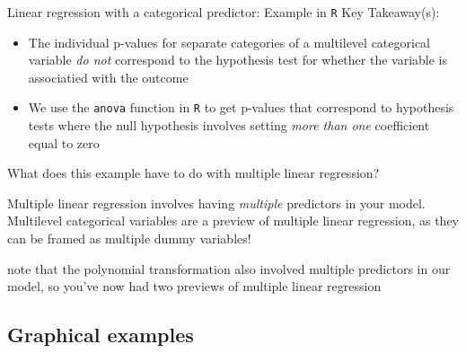 \documentclass[10pt,t]{beamer}
\begin{document}
\begin{frame}{Linear regression with a categorical predictor: Example in \texttt{R}}
Key Takeaway(s):
\vspace{0.3cm}

\begin{itemize}
	\item The individual p-values for separate categories of a multilevel categorical variable \textit{do not} correspond to the hypothesis test for whether the variable is associatied with the outcome
	\item We use the \texttt{anova} function in \texttt{R} to get p-values that correspond to hypothesis tests where the null hypothesis involves setting \textit{more than one} coefficient equal to zero
\end{itemize} \pause

\vspace{0.3cm}

What does this example have to do with multiple linear regression? 

\vspace{0.3cm}

Multiple linear regression involves having \textit{multiple} predictors in your model. Multilevel categorical variables are a preview of multiple linear regression, as they can be framed as multiple dummy variables! \pause

\vspace{0.2cm}

\tiny *note that the polynomial transformation also involved multiple predictors in our model, so you've now had two previews of multiple linear regression

\end{frame}

\subsection{Graphical examples}
\end{document}
